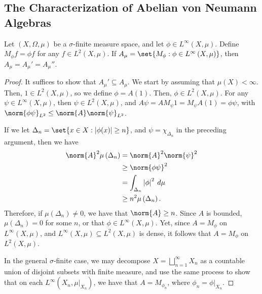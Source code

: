 \documentclass[10pt]{mypackage}
\begin{document}
\subsection{The Characterization of Abelian von Neumann Algebras}%
\begin{theorem}
  Let $\left( X,\Omega,\mu \right)$ be a $\sigma$-finite measure space, and let $\phi\in L^{\infty}\left( X,\mu \right)$. Define $M_{\phi}f = \phi f$ for any $f\in L^2\left( X,\mu \right)$. If $A_{\mu} = \set{M_{\phi} : \phi\in L^{\infty}\left( X,\mu \right)}$, then $A_{\mu} = A_{\mu}' = A_{\mu}''$.
\end{theorem}
\begin{proof}
  It suffices to show that $A_{\mu}' \subseteq A_{\mu}$. We start by assuming that $\mu(X) < \infty$. Then, $1\in L^2\left( X,\mu \right)$, so we define $\phi = A(1)$. Then, $\phi\in L^2\left( X,\mu \right)$. For any $\psi\in L^{\infty}\left( X,\mu \right)$, then $\psi\in L^2\left( X,\mu \right)$, and $A\psi = AM_{\psi}1 = M_{\psi}A(1) = \phi\psi$, with $\norm{\phi\psi}_{L^2}\leq \norm{A}\norm{\psi}_{L^2}$.

  If we let $\Delta_n = \set{x\in X : \left\vert \phi(x) \right\vert \geq n}$, and $\psi = \chi_{\Delta_n}$ in the preceding argument, then we have
  \begin{align*}
    \norm{A}^2\mu\left( \Delta_n \right) &= \norm{A}^2\norm{\psi}^2\\
                                         &\geq \norm{\phi\psi}^2\\
                                         &= \int_{\Delta_n}^{} \left\vert \phi \right\vert^2\:d\mu\\
                                         &\geq n^2\mu\left( \Delta_n \right).
  \end{align*}
  Therefore, if $\mu\left( \Delta_n \right) \neq 0$, we have that $\norm{A} \geq n$. Since $A$ is bounded, $\mu\left( \Delta_n \right) = 0$ for some $n$, or that $\phi\in L^{\infty}\left( X,\mu \right)$. Yet, since $A = M_{\phi}$ on $L^{\infty}\left( X,\mu \right)$, and $L^{\infty}\left( X,\mu \right)\subseteq L^2\left( X,\mu \right)$ is dense, it follows that $A = M_{\phi}$ on $L^2\left( X,\mu \right)$.

  In the general $\sigma$-finite case, we may decompose $X = \bigsqcup_{n=1}^{\infty}X_n$ as a countable union of disjoint subsets with finite measure, and use the same process to show that on each $L^{\infty}\left( X_n,\mu|_{X_n} \right)$, we have that $A = M_{\phi_n}$, where $\phi_n = \phi|_{X_n}$.
\end{proof}
\end{document}
